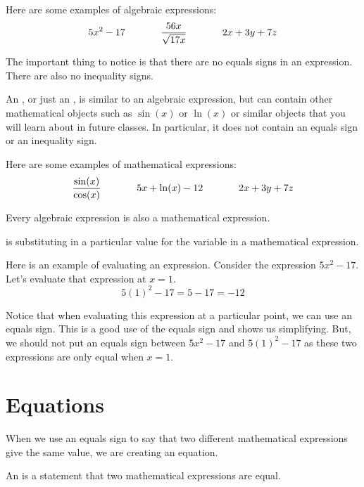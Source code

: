 \documentclass{ximera}
\begin{document}
Here are some examples of algebraic expressions:
\[
5x^2-17  \hspace{.5in}
\frac{56x}{\sqrt{17x}}  \hspace{.5in}
2x+3y+7z
\]

The important thing to notice is that there are no equals signs in an expression.  There are also no inequality signs.

\begin{definition}
An , or just an , is similar to an algebraic expression, but can contain other mathematical objects such as $\sin(x)$ or $\ln(x)$ or similar objects that you will learn about in future classes.  In particular, it does not contain an equals sign or an inequality sign.
\end{definition}

Here are some examples of mathematical expressions:
\[
\frac{\sin(x)}{\cos(x)}  \hspace{.5in}
5x+\ln(x)-12  \hspace{.5in}
2x+3y+7z
\]

Every algebraic expression is also a mathematical expression.

\begin{definition}
 is substituting in a particular value for the variable in a mathematical expression.
\end{definition}

Here is an example of evaluating an expression.  Consider the expression $5x^2-17$.  Let's evaluate that expression at $x=1$.
\[
5(1)^2-17=5-17=-12
\]

Notice that when evaluating this expression at a particular point, we can use an equals sign.  This is a good use of the equals sign and shows us simplifying.  But, we should not put an equals sign between $5x^2-17$ and $5(1)^2-17$ as these two expressions are only equal when $x=1$.

\section{Equations}
When we use an equals sign to say that two different mathematical expressions give the same value, we are creating an equation.

\begin{definition}
An  is a statement that two mathematical expressions are equal.
\end{definition}
\end{document}
